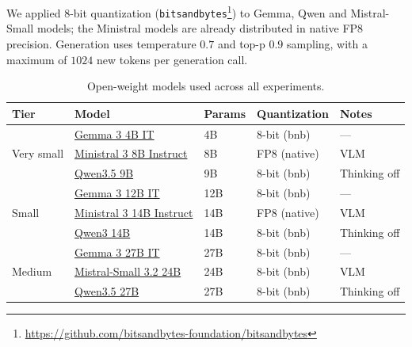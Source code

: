 We applied $8$-bit quantization (\texttt{bitsandbytes}\footnote{\url{https://github.com/bitsandbytes-foundation/bitsandbytes}}) to Gemma, Qwen and Mistral-Small models; the Ministral models are already distributed in native FP8 precision. Generation uses temperature $0.7$ and top-p $0.9$ sampling, with a maximum of $1024$ new tokens per generation call.

\begin{table}
\centering
\small
\caption{Open-weight models used across all experiments. }
\label{tab:experiment-models}
\begin{tabular}{lllll}
\toprule
\textbf{Tier} & \textbf{Model} & \textbf{Params} & \textbf{Quantization} & \textbf{Notes} \\
\midrule
\multirow{3}{*}{Very small}
  & \href{https://huggingface.co/google/gemma-3-4b-it}{Gemma 3 4B IT}                         & 4B  & 8-bit (bnb)    & --- \\
  & \href{https://huggingface.co/mistralai/Ministral-3-8B-Instruct-2512}{Ministral 3 8B Instruct} & 8B  & FP8 (native)   & VLM \\
  & \href{https://huggingface.co/Qwen/Qwen3.5-9B}{Qwen3.5 9B}                                  & 9B  & 8-bit (bnb)    & Thinking off \\
\midrule
\multirow{3}{*}{Small}
  & \href{https://huggingface.co/google/gemma-3-12b-it}{Gemma 3 12B IT}                        & 12B & 8-bit (bnb)    & --- \\
  & \href{https://huggingface.co/mistralai/Ministral-3-14B-Instruct-2512}{Ministral 3 14B Instruct} & 14B & FP8 (native)   & VLM \\
  & \href{https://huggingface.co/Qwen/Qwen3-14B}{Qwen3 14B}                                    & 14B & 8-bit (bnb)    & Thinking off \\
\midrule
\multirow{3}{*}{Medium}
  & \href{https://huggingface.co/google/gemma-3-27b-it}{Gemma 3 27B IT}                        & 27B & 8-bit (bnb)    & --- \\
  & \href{https://huggingface.co/mistralai/Mistral-Small-3.2-24B-Instruct-2506}{Mistral-Small 3.2 24B} & 24B & 8-bit (bnb)    & VLM \\
  & \href{https://huggingface.co/Qwen/Qwen3.5-27B}{Qwen3.5 27B}                                & 27B & 8-bit (bnb)    & Thinking off \\
\bottomrule
\end{tabular}
\end{table}


